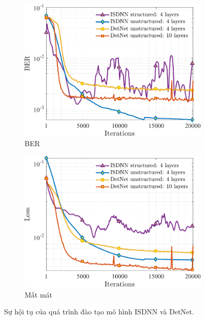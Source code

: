 \begin{figure}[ht]
     \centering
     \begin{subfigure}[b]{0.48\textwidth}
         \centering
         \includegraphics[width=\textwidth]{figures/BER_1.pdf}
         \caption{BER}
         \label{fig:ber_1}
     \end{subfigure}
     \hfill
     \begin{subfigure}[b]{0.48\textwidth}
         \centering
         \includegraphics[width=\textwidth]{figures/Loss_1.pdf}
         \caption{Mất mát}
         \label{fig:loss_1}
     \end{subfigure}
     \hfill
        \caption{Sự hội tụ của quá trình đào tạo mô hình ISDNN và DetNet.}
        \label{fig:training_1}
\end{figure}

